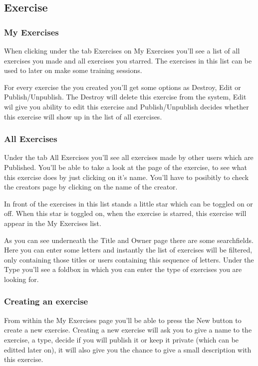 \documentclass[11pt,a4paper]{scrartcl}
\begin{document}
\subsection{Exercise}
\subsubsection{My Exercises}
When clicking under the tab Exercises on My Exercises you'll see a list of all exercises you made and all exercises you starred. The 
exercises in this list can be used to later on make some training sessions.

For every exercise the you created you'll get some options as Destroy, Edit or Publish/Unpublish. The Destroy will delete this exercise
from the system, Edit wil give you ability to edit this exercise and Publish/Unpublish decides whether this exercise will show up
in the list of all exercises.
\subsubsection{All Exercises}
Under the tab All Exercises you'll see all exercises made by other users which are Published. You'll be able to take a look at the 
page of the exercise, to see what this exercise does by just clicking on it's name. You'll have to posibitly to check the creators page
by clicking on the name of the creator.

In front of the exercises in this list stands a little star which can be toggled on or off. When this star is toggled on, when the 
exercise is starred, this exercise will appear in the My Exercises list.

As you can see underneath the Title and Owner page there are some searchfields. Here you can enter some letters and instantly the 
list of exercises will be filtered, only containing those titles or users containing this sequence of letters. Under the Type you'll see
a foldbox in which you can enter the type of exercises you are looking for.

\subsubsection{Creating an exercise}
From within the My Exercises page you'll be able to press the New button to create a new exercise. Creating a new exercise will ask you
to give a name to the exercise, a type, decide if you will publish it or keep it private (which can be editted later on), it will also 
give you the chance to give a small description with this exercise.
\end{document}
